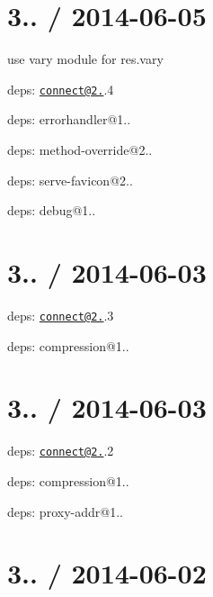 \section*{3.. / 2014-\/06-\/05 }


\begin{DoxyItemize}
\item use {\ttfamily vary} module for {\ttfamily res.\+vary}
\item deps\+: \href{mailto:connect@2.19}{\tt connect@2.}.4
\begin{DoxyItemize}
\item deps\+: errorhandler@1..
\item deps\+: method-\/override@2..
\item deps\+: serve-\/favicon@2..
\end{DoxyItemize}
\item deps\+: debug@1..
\end{DoxyItemize}

\section*{3.. / 2014-\/06-\/03 }


\begin{DoxyItemize}
\item deps\+: \href{mailto:connect@2.19}{\tt connect@2.}.3
\begin{DoxyItemize}
\item deps\+: compression@1..
\end{DoxyItemize}
\end{DoxyItemize}

\section*{3.. / 2014-\/06-\/03 }


\begin{DoxyItemize}
\item deps\+: \href{mailto:connect@2.19}{\tt connect@2.}.2
\begin{DoxyItemize}
\item deps\+: compression@1..
\end{DoxyItemize}
\item deps\+: proxy-\/addr@1..
\end{DoxyItemize}

\section*{3.. / 2014-\/06-\/02 }


